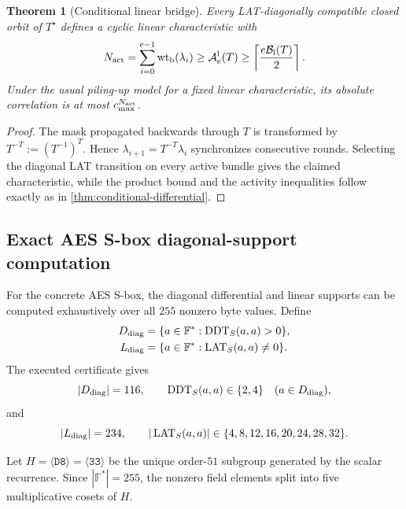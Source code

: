 \documentclass[10pt,reqno]{amsart}
\theoremstyle{plain}
\newtheorem{theorem}{Theorem}[section]
\theoremstyle{remark}\newtheorem{remark}[theorem]{Remark}
\theoremstyle{definition}\newtheorem{definition}[theorem]{Definition}
\newcommand{\F}{\mathbb F}
\newcommand{\wt}{\operatorname{wt}}
\newcommand{\hex}[1]{\mathtt{#1}}
\begin{document}
\begin{theorem}[Conditional linear bridge]\label{thm:conditional-linear}
Every LAT-diagonally compatible closed orbit of $T^\star$ defines a cyclic linear characteristic with
\[
N_{\rm act}=\sum_{i=0}^{e-1}\wt_{\rm b}(\lambda_i)
\ge\mathcal A_e^{\rm l}(T)
\ge\left\lceil\frac{e\mathcal B_{\rm l}(T)}2\right\rceil.
\]
Under the usual piling-up model for a fixed linear characteristic, its absolute correlation is at most $c_{\max}^{N_{\rm act}}$.
\end{theorem}
\begin{proof}
The mask propagated backwards through $T$ is transformed by $T^{-T}:=(T^{-1})^{T}$. Hence $\lambda_{i+1}=T^{-T}\lambda_i$ synchronizes consecutive rounds. Selecting the diagonal LAT transition on every active bundle gives the claimed characteristic, while the product bound and the activity inequalities follow exactly as in \cref{thm:conditional-differential}. \end{proof}


\subsection{Exact AES S-box diagonal-support computation}
\label{subsec:aes-sbox-diagonal}
For the concrete AES S-box, the diagonal differential and linear supports
can be computed exhaustively over all $255$ nonzero byte values. Define
\begin{align}
D_{\rm diag}&=\{a\in\F^*: \operatorname{DDT}_S(a,a)>0\},\\
L_{\rm diag}&=\{a\in\F^*: \operatorname{LAT}_S(a,a)\ne0\}.
\end{align}
The executed certificate gives
\begin{equation}
 |D_{\rm diag}|=116,
 \qquad
 \operatorname{DDT}_S(a,a)\in\{2,4\}
 \quad(a\in D_{\rm diag}),
 \label{eq:aes-ddt-diag-count}
\end{equation}
and
\begin{equation}
 |L_{\rm diag}|=234,
 \qquad
 |\operatorname{LAT}_S(a,a)|\in
 \{4,8,12,16,20,24,28,32\}.
 \label{eq:aes-lat-diag-count}
\end{equation}

Let $H=\langle\hex{D8}\rangle=\langle\hex{33}\rangle$ be the unique
order-$51$ subgroup generated by the scalar recurrence. Since
$|\F^*|=255$, the nonzero field elements split into five multiplicative
cosets of $H$.
\end{document}
